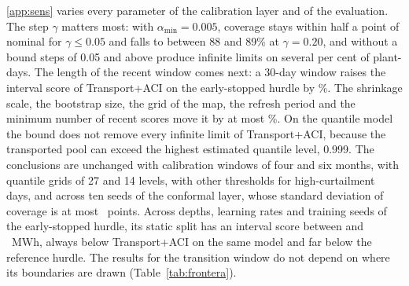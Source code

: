 \ref{app:sens} varies every parameter of the calibration layer and of the evaluation. The step $\gamma$ matters most: with $\alpha_{\min}=0.005$, coverage stays within half a point of nominal for $\gamma\le0.05$ and falls to between 88 and 89\% at $\gamma=0.20$, and without a bound steps of 0.05 and above produce infinite limits on several per cent of plant-days. The length of the recent window comes next: a 30-day window raises the interval score of Transport+ACI on the early-stopped hurdle by \%. The shrinkage scale, the bootstrap size, the grid of the map, the refresh period and the minimum number of recent scores move it by at most \%. On the quantile model the bound does not remove every infinite limit of Transport+ACI, because the transported pool can exceed the highest estimated quantile level, 0.999. The conclusions are unchanged with calibration windows of four and six months, with quantile grids of 27 and 14 levels, with other thresholds for high-curtailment days, and across ten seeds of the conformal layer, whose standard deviation of coverage is at most ~points. Across depths, learning rates and training seeds of the early-stopped hurdle, its static split has an interval score between  and ~MWh, always below Transport+ACI on the same model and far below the reference hurdle. The results for the transition window do not depend on where its boundaries are drawn (Table~\ref{tab:frontera}).
